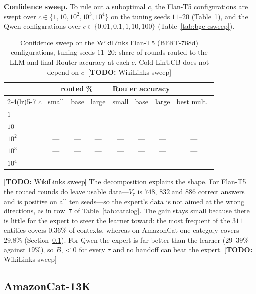 \documentclass{article}
\theoremstyle{definition}
\theoremstyle{remark}
\theoremstyle{remark}
\newcommand{\todo}[1]{\textcolor{red!70!black}{[\textbf{TODO:} #1]}}
\begin{document}
\textbf{Confidence sweep.} To rule out a suboptimal $c$, the Flan-T5
configurations are swept over $c\in\{1,10,10^2,10^3,10^4\}$ on the tuning seeds
$11$--$20$ (Table~\ref{tab:wiki-csweep}), and the Qwen configurations over
$c\in\{0.01,0.1,1,10,100\}$ (Table~\ref{tab:bge-csweep}).

\begin{table}[h]
\centering
\caption{Confidence sweep on the WikiLinks Flan-T5 (BERT-768d) configurations,
tuning seeds $11$--$20$: share of rounds routed to the LLM and final Router
accuracy at each $c$. Cold LinUCB does not depend on $c$. \todo{WikiLinks sweep}}
\label{tab:wiki-csweep}
\scriptsize
\setlength{\tabcolsep}{4pt}
\begin{tabular}{@{}lccccccc@{}}
\toprule
& \multicolumn{3}{c}{routed \%} & \multicolumn{3}{c}{Router accuracy} & \\
\cmidrule(lr){2-4}\cmidrule(lr){5-7}
$c$ & small & base & large & small & base & large & best mult.\ \\
\midrule
$1$ & --- & --- & --- & --- & --- & --- & --- \\
$10$ & --- & --- & --- & --- & --- & --- & --- \\
$10^2$ & --- & --- & --- & --- & --- & --- & --- \\
$10^3$ & --- & --- & --- & --- & --- & --- & --- \\
$10^4$ & --- & --- & --- & --- & --- & --- & --- \\
\bottomrule
\end{tabular}
\end{table}

\todo{WikiLinks sweep} The decomposition explains the shape. For Flan-T5 the routed rounds do leave
usable data---$V_\tau$ is $748$, $832$ and $886$ correct answers and is
positive on all ten seeds---so the expert's data is not aimed at the wrong
directions, as in row~7 of Table~\ref{tab:catalog}. The gain stays small
because there is little for the expert to steer the learner toward: the most
frequent of the $311$ entities covers $0.36\%$ of contexts, whereas on
AmazonCat one category covers $29.8\%$ (Section~\ref{sec:amazon}). For Qwen the expert is far better than the
learner ($29$--$39\%$ against $19\%$), so $B_\tau<0$ for every $\tau$ and no
handoff can beat the expert. \todo{WikiLinks sweep}

\subsection{AmazonCat-13K}
\label{sec:amazon}
\end{document}
